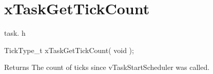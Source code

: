 \hypertarget{group__x_task_get_tick_count}{}\section{x\+Task\+Get\+Tick\+Count}
\label{group__x_task_get_tick_count}
task. h 
\begin{DoxyPre}TickType\_t xTaskGetTickCount( void );\end{DoxyPre}


\begin{DoxyReturn}{Returns}
The count of ticks since v\+Task\+Start\+Scheduler was called. 
\end{DoxyReturn}
